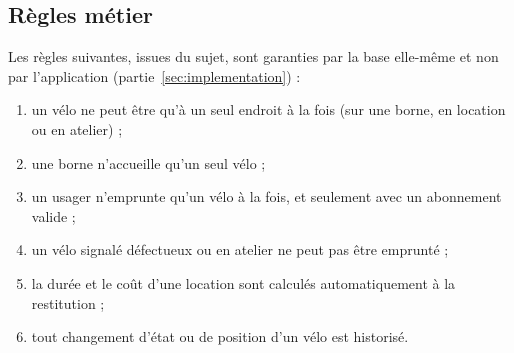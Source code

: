 \subsection{Règles métier}

Les règles suivantes, issues du sujet, sont garanties par la base elle-même et non par l'application (partie~\ref{sec:implementation}) :
\begin{enumerate}
	\item un vélo ne peut être qu'à un seul endroit à la fois (sur une borne, en location ou en atelier) ;
	\item une borne n'accueille qu'un seul vélo ;
	\item un usager n'emprunte qu'un vélo à la fois, et seulement avec un abonnement valide ;
	\item un vélo signalé défectueux ou en atelier ne peut pas être emprunté ;
	\item la durée et le coût d'une location sont calculés automatiquement à la restitution ;
	\item tout changement d'état ou de position d'un vélo est historisé.
\end{enumerate}
